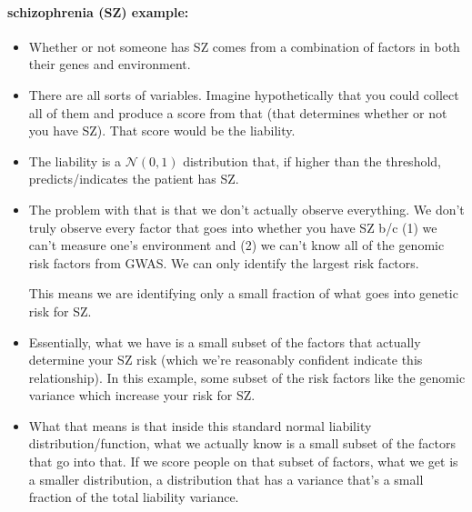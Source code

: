 \paragraph*{schizophrenia (SZ) example:}
\begin{itemize}
\item
	Whether or not someone has SZ comes from a combination of factors in both their genes and environment.
\item
	There are all sorts of variables. Imagine hypothetically that you could collect all of them and produce a score from that (that determines whether or not you have SZ). That score would be the liability.
\item
	The liability is a $\mathcal{N}(0,1)$ distribution that, if higher than the threshold, predicts/indicates the patient has SZ.
\item
	The problem with that is that we don't actually observe everything. We don't truly observe every factor that goes into whether you have SZ b/c (1) we can't measure one's environment and (2) we can't know all of the genomic risk factors from GWAS. We can only identify the largest risk factors.

	This means we are identifying only a small fraction of what goes into genetic risk for SZ.
\item
	Essentially, what we have is a small subset of the factors that actually determine your SZ risk (which we're reasonably confident indicate this relationship). In this example, some subset of the risk factors  like the genomic variance which increase your risk for SZ.
\item
	What that means is that inside this standard normal liability distribution/function, what we actually know is a small subset of the factors that go into that. If we score people on that subset of factors, what we get is a smaller distribution, a distribution that has a variance that's a small fraction of the total liability variance.
\end{itemize}
